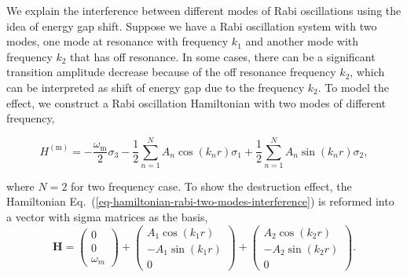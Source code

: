 \documentclass[%
reprint,
 amsmath,amssymb,
 prd,
]{revtex4-1}
\begin{document}



We explain the interference between different modes of Rabi oscillations using the idea of energy gap shift. Suppose we have a Rabi oscillation system with two modes, one mode at resonance with frequency $k_1$ and another mode with frequency $k_2$ that has off resonance. In some cases, there can be a significant transition amplitude decrease because of the off resonance frequency $k_2$, which can be interpreted as shift of energy gap due to the frequency $k_2$. To model the effect, we construct a Rabi oscillation Hamiltonian with two modes of different frequency,
\begin{widetext}
\begin{equation}
H^{(\mathrm{m})}  = -\frac{\omega_{\mathrm{m}}}{2} \sigma_3 - \frac{1}{2} \sum_{n=1}^N  A_n \cos (k_n r) \sigma_1 + \frac{1}{2} \sum_{n=1}^N  A_n \sin (k_n r) \sigma_2,
\label{eq-hamiltonian-rabi-two-modes-interference}
\end{equation}
\end{widetext}
where $N=2$ for two frequency case. To show the destruction effect, the Hamiltonian Eq.~(\ref{eq-hamiltonian-rabi-two-modes-interference}) is reformed into a vector with sigma matrices as the basis,
\begin{equation}
\mathbf H = \begin{pmatrix}
0\\
0\\
\omega_m
\end{pmatrix} + \begin{pmatrix}
A_1 \cos (k_1 r)\\
-A_1 \sin (k_1 r)\\
0
\end{pmatrix} + \begin{pmatrix}
A_2 \cos (k_2 r)\\
-A_2 \sin (k_2 r)\\
0
\end{pmatrix}.
\end{equation}
\end{document}

